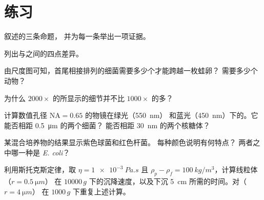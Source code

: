 \section{练习}

\begin{exercise}[$\star$]\label{exo:b1:cell-unit-of-life:1}
叙述的三条命题，
并为每一条举出一项证据。
\end{exercise}

\begin{exercise}[$\star$]\label{exo:b1:cell-unit-of-life:2}
列出与之间的四点差异。
\end{exercise}

\begin{exercise}[$\star$]\label{exo:b1:cell-unit-of-life:3}
由尺度图可知，首尾相接排列的细菌需要多少个才能跨越一枚蛙卵？
需要多少个动物？
\end{exercise}

\begin{exercise}[$\star$]\label{exo:b1:cell-unit-of-life:4}
为什么 $2000\times$ 的所显示的细节并不比
$1000\times$ 的多？
\end{exercise}

\begin{exercise}[$\star\star$]\label{exo:b1:cell-unit-of-life:5}
计算数值孔径 $\mathrm{NA} = 0.65$ 的物镜在绿光（\qty{550}{nm}）
和蓝光（\qty{450}{nm}）下的。它能否相距 \qty{0.5}{\micro m} 的两个细菌？
能否相距
\qty{30}{nm} 的两个核糖体？
\end{exercise}

\begin{exercise}[$\star\star$]\label{exo:b1:cell-unit-of-life:6}
某混合培养物的结果显示紫色球菌和红色杆菌。
每种颜色说明有何特点？
两者之中哪一种是 \emph{E. coli}？
\end{exercise}

\begin{exercise}[$\star\star$]\label{exo:b1:cell-unit-of-life:7}
利用斯托克斯定律，取 $\eta = \qty{1e-3}{Pa.s}$ 且 $\rho_p - \rho_f =
\qty{100}{kg/m^3}$，计算线粒体（$r = \qty{0.5}{\micro m}$）
在 $\num{10000}\,g$ 下的沉降速度，以及下沉
\qty{5}{cm} 所需的时间。对（$r = \qty{4}{\micro m}$）
在 $1000\,g$ 下重复上述计算。
\end{exercise}

